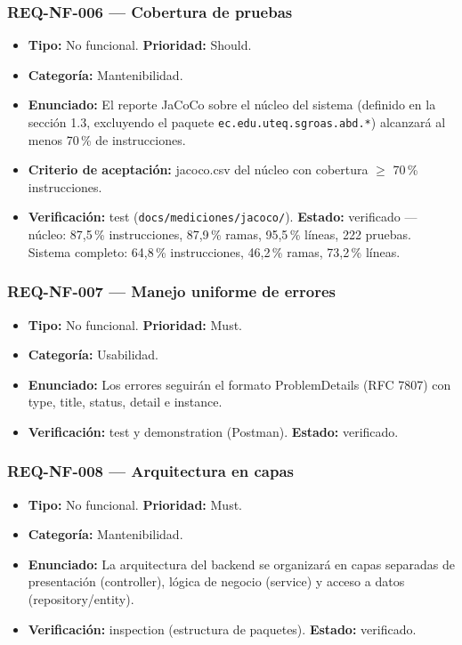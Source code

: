 \documentclass[12pt,a4paper]{article}
\begin{document}
\subsubsection{REQ-NF-006 --- Cobertura de pruebas}
\begin{itemize}
  \item \textbf{Tipo:} No funcional. \textbf{Prioridad:} Should.
  \item \textbf{Categoría:} Mantenibilidad.
  \item \textbf{Enunciado:} El reporte JaCoCo sobre el núcleo del sistema (definido en la sección 1.3, excluyendo el paquete \texttt{ec.edu.uteq.sgroas.abd.*}) alcanzará al menos 70\,\% de instrucciones.
  \item \textbf{Criterio de aceptación:} jacoco.csv del núcleo con cobertura $\ge$ 70\,\% instrucciones.
  \item \textbf{Verificación:} test (\texttt{docs/mediciones/jacoco/}). \textbf{Estado:} verificado --- núcleo: 87,5\,\% instrucciones, 87,9\,\% ramas, 95,5\,\% líneas, 222 pruebas. Sistema completo: 64,8\,\% instrucciones, 46,2\,\% ramas, 73,2\,\% líneas.
\end{itemize}

\subsubsection{REQ-NF-007 --- Manejo uniforme de errores}
\begin{itemize}
  \item \textbf{Tipo:} No funcional. \textbf{Prioridad:} Must.
  \item \textbf{Categoría:} Usabilidad.
  \item \textbf{Enunciado:} Los errores seguirán el formato ProblemDetails (RFC 7807) con type, title, status, detail e instance.
  \item \textbf{Verificación:} test y demonstration (Postman). \textbf{Estado:} verificado.
\end{itemize}

\subsubsection{REQ-NF-008 --- Arquitectura en capas}
\begin{itemize}
  \item \textbf{Tipo:} No funcional. \textbf{Prioridad:} Must.
  \item \textbf{Categoría:} Mantenibilidad.
  \item \textbf{Enunciado:} La arquitectura del backend se organizará en capas separadas de presentación (controller), lógica de negocio (service) y acceso a datos (repository/entity).
  \item \textbf{Verificación:} inspection (estructura de paquetes). \textbf{Estado:} verificado.
\end{itemize}
\end{document}
